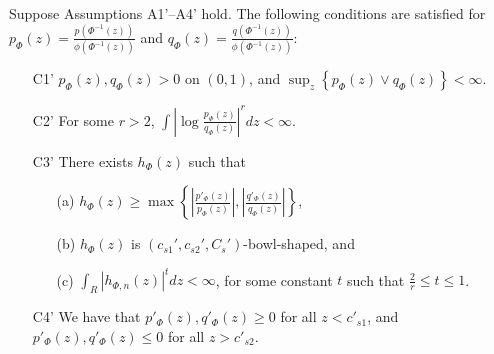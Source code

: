\documentclass{article}
\begin{document}
\begin{proposition}
\label{prop:transformation2}
Suppose Assumptions A1'--A4' hold.
The following conditions are satisfied for $p_\Phi(z) = \frac{p(\Phi^{-1}(z))}{\phi(\Phi^{-1}(z))}$ and $q_\Phi(z) = \frac{q(\Phi^{-1}(z))}{\phi(\Phi^{-1}(z))}$:
\begin{enumerate}
\item[C1'] $p_{\Phi}(z), q_{\Phi}(z) > 0$ on $(0, 1)$, and $\sup_z \left\{p_{\Phi}(z) \vee q_{\Phi}(z)\right\} < \infty$. 
\item[C2'] For some $r > 2$, $\int \left| \log \frac{p_\Phi(z)}{q_\Phi(z)} \right|^r dz < \infty$.
\item[C3']  There exists $h_{\Phi}(z)$ such that
\begin{itemize}
\item[(a)] $h_{\Phi}(z) \geq \max \left\{  \left|\frac{p'_\Phi(z)}{p_\Phi(z)} \right|, 
 \left|\frac{q'_\Phi(z)}{q_\Phi(z)}\right|  \right\}$,
\item[(b)] $h_{\Phi}(z)$ is $(c_{s1}', c_{s2}', C_s')$-bowl-shaped, and
\item[(c)] $\int_R |h_{\Phi,n}(z)|^t dz < \infty$, for some constant $t$ such that $\frac{2}{r} \le t \le 1$.
\end{itemize} 
\item[C4']  We have that $p'_\Phi(z), q'_\Phi(z) \geq 0$ for all $z < c'_{s1}$, and $p'_\Phi(z), q'_\Phi(z) \leq 0$ for all $z > c'_{s2}$. 
\end{enumerate}

\end{proposition}
\end{document}
